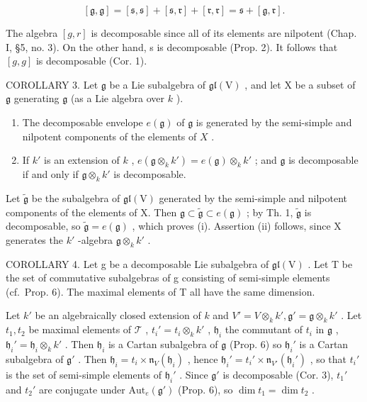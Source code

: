 \[
[ \mathfrak {g}, \mathfrak {g} ] = [ \mathfrak {s}, \mathfrak {s} ] + [ \mathfrak {s}, \mathfrak {r} ] + [ \mathfrak {r}, \mathfrak {r} ] = \mathfrak {s} + [ \mathfrak {g}, \mathfrak {r} ].
\]

The algebra \([g,r]\) is decomposable since all of its elements are nilpotent (Chap. I, §5, no. 3). On the other hand, s is decomposable (Prop. 2). It follows that \([g,g]\) is decomposable (Cor. 1).

COROLLARY 3. Let \(\mathfrak{g}\) be a Lie subalgebra of \(\mathfrak{gl}(\mathrm{V})\) , and let \(\mathrm{X}\) be a subset of \(\mathfrak{g}\) generating \(\mathfrak{g}\) (as a Lie algebra over \(k\) ).

\begin{enumerate}
\def\labelenumi{(\roman{enumi})}
\item
  The decomposable envelope \(e(\mathfrak{g})\) of \(\mathfrak{g}\) is generated by the semi-simple and nilpotent components of the elements of \(X\) .
\item
  If \(k'\) is an extension of \(k\) , \(e(\mathfrak{g} \otimes_k k') = e(\mathfrak{g}) \otimes_k k'\) ; and \(\mathfrak{g}\) is decomposable if and only if \(\mathfrak{g} \otimes_k k'\) is decomposable.
\end{enumerate}

Let \(\tilde{\mathfrak{g}}\) be the subalgebra of \(\mathfrak{gl}(\mathrm{V})\) generated by the semi-simple and nilpotent components of the elements of X. Then \(\mathfrak{g} \subset \tilde{\mathfrak{g}} \subset e(\mathfrak{g})\) ; by Th. 1, \(\tilde{\mathfrak{g}}\) is decomposable, so \(\tilde{\mathfrak{g}} = e(\mathfrak{g})\) , which proves (i). Assertion (ii) follows, since X generates the \(k'\) -algebra \(\mathfrak{g} \otimes_k k'\) .

COROLLARY 4. Let g be a decomposable Lie subalgebra of \(\mathfrak{gl}(\mathrm{V})\) . Let T be the set of commutative subalgebras of g consisting of semi-simple elements (cf.~Prop. 6). The maximal elements of T all have the same dimension.

Let \(k'\) be an algebraically closed extension of \(k\) and \(V' = V \otimes_k k', \mathfrak{g}' = \mathfrak{g} \otimes_k k'\) . Let \(t_1, t_2\) be maximal elements of \(\mathcal{T}\) , \(t_i' = t_i \otimes_k k'\) , \(\mathfrak{h}_i\) the commutant of \(t_i\) in \(\mathfrak{g}\) , \(\mathfrak{h}_i' = \mathfrak{h}_i \otimes_k k'\) . Then \(\mathfrak{h}_i\) is a Cartan subalgebra of \(\mathfrak{g}\) (Prop. 6) so \(\mathfrak{h}_i'\) is a Cartan subalgebra of \(\mathfrak{g}'\) . Then \(\mathfrak{h}_i = t_i \times \mathfrak{n}_V(\mathfrak{h}_i)\) , hence \(\mathfrak{h}_i' = t_i' \times \mathfrak{n}_{V'}(\mathfrak{h}_i')\) , so that \(t_i'\) is the set of semi-simple elements of \(\mathfrak{h}_i'\) . Since \(\mathfrak{g}'\) is decomposable (Cor. 3), \(t_1'\) and \(t_2'\) are conjugate under \(\text{Aut}_e(\mathfrak{g}')\) (Prop. 6), so \(\dim t_1 = \dim t_2\) .

